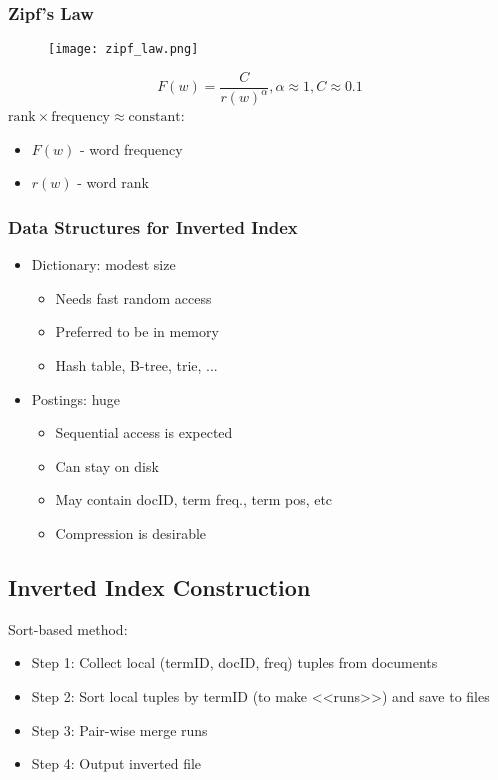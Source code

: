 \subsubsection{Zipf’s Law}
\begin{figure}[H]
    \centering
    \texttt{[image: zipf\_law.png]}
\end{figure}

\begin{equation*}
F(w) = \frac{C}{r(w)^\alpha}, \alpha \approx 1, C \approx 0.1
\end{equation*}
$\textrm{rank} \times \textrm{frequency} \approx \textrm{constant}$:
\begin{itemize}
\item $F(w)$ - word frequency
\item $r(w)$ - word rank
\end{itemize}


\subsubsection{Data Structures for Inverted Index}
\begin{itemize}
\item Dictionary: modest size
\begin{itemize}
\item Needs fast random access 
\item Preferred to be in memory 
\item Hash table, B-tree, trie, ...
\end{itemize}

\item Postings: huge
\begin{itemize}
\item Sequential access is expected
\item Can stay on disk
\item May contain docID, term freq., term pos, etc 
\item Compression is desirable
\end{itemize}
\end{itemize}

\subsection{Inverted Index Construction}

Sort-based method:
\begin{itemize}
\item Step 1: Collect local (termID, docID, freq) tuples from documents
\item Step 2: Sort local tuples by termID (to make <<runs>>) and save to files
\item Step 3: Pair-wise merge runs
\item Step 4: Output inverted file
\end{itemize}



